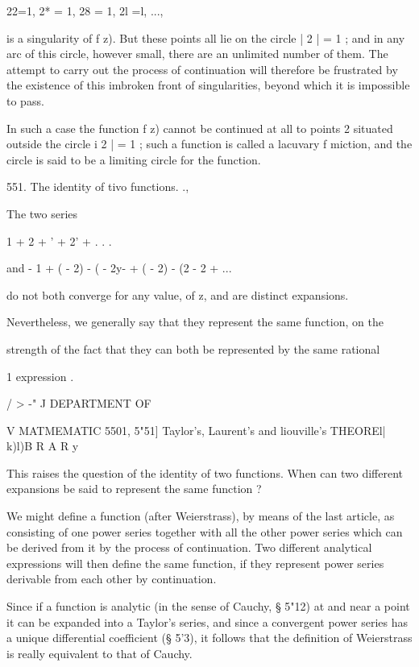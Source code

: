 {{22=1, 2* = 1, 28 = 1, 2l =l, ..., 

is a singularity of f z). But these points all lie on the circle | 2 | = 1 ; and in any arc 
of this circle, however small, there are an unlimited number of them. The attempt to 
carry out the process of continuation will therefore be frustrated by the existence of this 
imbroken front of singularities, beyond which it is impossible to pass. 

In such a case the function f z) cannot be continued at all to points 2 situated outside 
the circle i 2 | = 1 ; such a function is called a lacuvary f miction, and the circle is said to be 
a limiting circle for the function. 

551. The identity of tivo functions. ., 

The two series 

1 + 2 +  ' + 2' + . . . 

and - 1 + (  - 2) - (  - 2y-  + (  - 2)  - (2 - 2  + ... 

do not both converge for any value, of z, and are distinct expansions. 

Nevertheless, we generally say that they represent the same function, on the 

strength of the fact that they can both be represented by the same rational 

1 
expression . 



/ > -" J DEPARTMENT OF 

V MATMEMATIC 
5501, 5"51] Taylor's, Laurent's and liouville's THEOREl| k)l)B R A R y 

This raises the question of the identity of two functions. When can two 
different expansions be said to represent the same function ? 

We might define a function (after Weierstrass), by means of the last 
article, as consisting of one power series together with all the other power 
series which can be derived from it by the process of continuation. Two 
different analytical expressions will then define the same function, if they 
represent power series derivable from each other by continuation. 

Since if a function is analytic (in the sense of Cauchy, § 5"12) at and near 
a point it can be expanded into a Taylor's series, and since a convergent 
power series has a unique differential coefficient (§ 5'3), it follows that the 
definition of Weierstrass is really equivalent to that of Cauchy. 

}}
